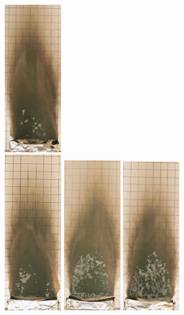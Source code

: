 \documentclass[twoside]{uocthesis}
\begin{document}
\begin{figure}[p]
	\includegraphics[width=1.0in]{../Figures/GBPUF5_IMG_9390} \\

	\includegraphics[width=1.0in]{../Figures/GBPUF6_IMG_9403}
	\includegraphics[width=1.0in]{../Figures/GBPUF7_IMG_9416}
	\includegraphics[width=1.0in]{../Figures/GBPUF8_IMG_9429}

\end{figure}
\end{document}
